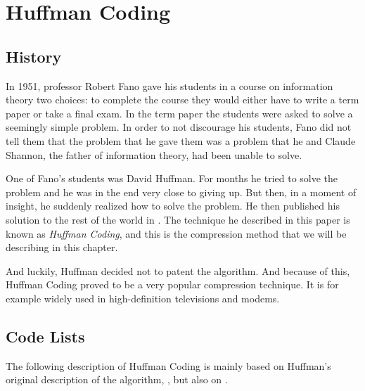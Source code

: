 \begin{comment}
  
\end{comment}


\chapter{Huffman Coding}
\label{cha:huffman}

\section{History}

In 1951, professor Robert Fano gave his students in a course on
information theory two choices: to complete the course they would
either have to write a term paper or take a final exam. In the term
paper the students were asked to solve a seemingly simple problem. In
order to not discourage his students, Fano did not tell them that the
problem that he gave them was a problem that he and Claude Shannon,
the father of information theory, had been unable to
solve\cite{stix91:_profil}.

One of Fano's students was David Huffman. For months he tried to solve
the problem and he was in the end very close to giving up. But then,
in a moment of insight, he suddenly realized how to solve the
problem. He then published his solution to the rest of the world in
\cite{huf52}. The technique he described in this paper is known as
\textit{Huffman Coding}, and this is the compression method that we
will be describing in this chapter.

And luckily, Huffman decided not to patent the algorithm. And because
of this, Huffman Coding proved to be a very popular compression
technique. It is for example widely used in high-definition
televisions and modems.

\section{Code Lists}

The following description of Huffman Coding is mainly based on
Huffman's original description of the algorithm, \cite{huf52}, but
also on
\cite{Salomon:2004:DCC,mark1996data_compression_book,mcfadden92:_hackin_data_compr,mahoney11:_data_compr_explain,Lelewer:1987:DC:45072.45074,cormen2009introduction_to_algo}.

